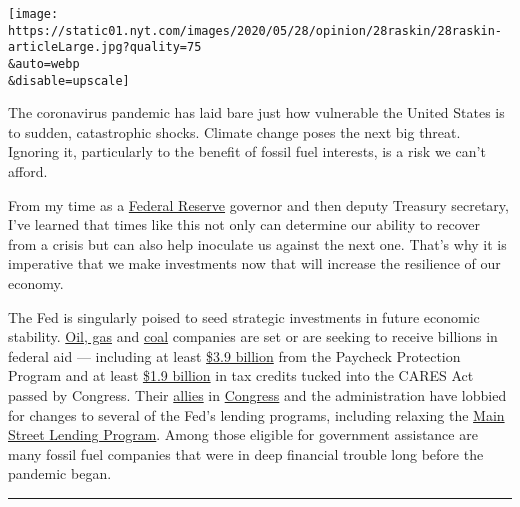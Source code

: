 \texttt{[image: https://static01.nyt.com/images/2020/05/28/opinion/28raskin/28raskin-articleLarge.jpg?quality=75\\\&auto=webp\\\&disable=upscale]}

The coronavirus pandemic has laid bare just how vulnerable the United
States is to sudden, catastrophic shocks. Climate change poses the next
big threat. Ignoring it, particularly to the benefit of fossil fuel
interests, is a risk we can't afford.

From my time as a
\href{https://www.nytimes.com/2020/06/10/business/economy/fed-june-meeting-coronavirus.html}{Federal
Reserve} governor and then deputy Treasury secretary, I've learned that
times like this not only can determine our ability to recover from a
crisis but can also help inoculate us against the next one. That's why
it is imperative that we make investments now that will increase the
resilience of our economy.

The Fed is singularly poised to seed strategic investments in future
economic stability.
\href{https://www.washingtonpost.com/news/powerpost/paloma/the-energy-202/2020/05/01/the-energy-202-oil-and-gas-companies-stand-to-gain-from-fed-loosening-coronavirus-loan-rules/5eab0bda602ff15fb0021673/}{Oil,
gas} and
\href{https://www.reuters.com/article/us-health-coronavirus-coal/u-s-coal-mining-industry-seeks-wide-ranging-coronavirus-bailout-letter-idUSKBN21701F}{coal}
companies are set or are seeking to receive billions in federal aid ---
including at least
\href{https://westernvaluesproject.org/over-one-third-of-all-oil-gas-and-mining-corporations-already-awarded-bailout-funds/}{\$3.9
billion} from the Paycheck Protection Program and at least
\href{https://www.bloomberg.com/news/articles/2020-05-15/-stealth-bailout-shovels-millions-of-dollars-to-oil-companies?sref=oUjKJw8m}{\$1.9
billion} in tax credits tucked into the CARES Act passed by Congress.
Their
\href{https://www.cruz.senate.gov/files/documents/Letters/4.24.2020\%20Oil\%20Gas\%20Fed\%20Lending\%20Facility\%20Letter.pdf}{allies}
in
\href{https://senatorkevincramer.app.box.com/s/981sfgn44nmkr8fq5hhf6xryxro6fyvp}{Congress}
and the administration have lobbied for changes to several of the Fed's
lending programs, including relaxing the
\href{https://www.bloomberg.com/news/articles/2020-05-12/energy-chief-says-fed-was-asked-to-expand-lending-for-oil-firms}{Main
Street Lending Program}. Among those eligible for government assistance
are many fossil fuel companies that were in deep financial trouble long
before the pandemic began.

\begin{center}\rule{0.5\linewidth}{\linethickness}\end{center}

